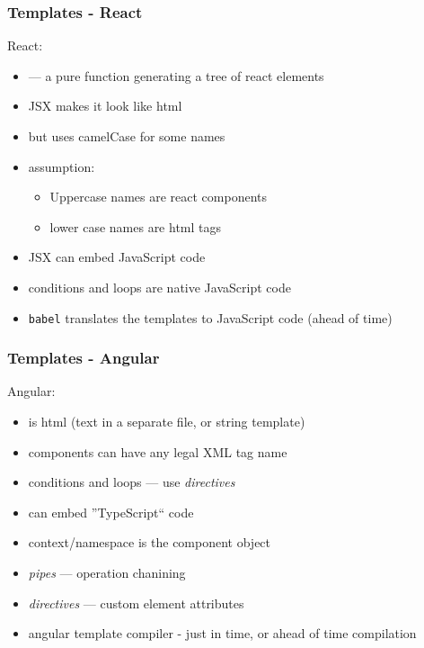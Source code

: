 \begin{frame}[fragile] \frametitle{Templates - React}

React:
\begin{itemize}
  \item {} --- a pure function generating a tree of react elements
  \item JSX makes it look like html
  \item but uses camelCase for some names
  \item assumption:
  \begin{itemize}
    \item Uppercase names are react components
    \item lower case names are html tags
  \end{itemize}
  \item JSX can embed JavaScript code
  \item conditions and loops are native JavaScript code
  \item {\tt babel} translates the templates to JavaScript code (ahead of time)
\end{itemize}
\end{frame}

\begin{frame}[fragile] \frametitle{Templates - Angular}
Angular:
\begin{itemize}
  \item is html (text in a separate file, or string template)
  \item components can have any legal XML tag name
  \item conditions and loops --- use \emph{directives}
  \item can embed ''TypeScript`` code
  \item context/namespace is the component object
  \item \emph{pipes} --- operation chanining
  \item \emph{directives} --- custom element attributes
  \item angular template compiler - just in time, or ahead of time compilation
\end{itemize}
\end{frame}

